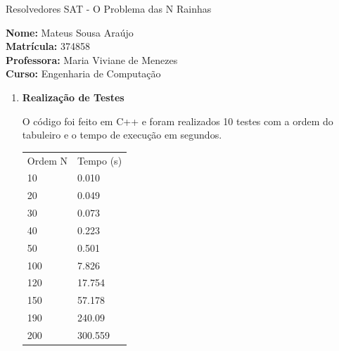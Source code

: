 \documentclass[11pt,a4paper]{article}
\begin{document}
	\begin{center}
		\Large Resolvedores SAT - O Problema das N Rainhas  
	\end{center}

\begin{flushleft}
\textbf{Nome:} Mateus Sousa Araújo \\
\textbf{Matrícula:} 374858 \\
\textbf{Professora:} Maria Viviane de Menezes \\
\textbf{Curso:} Engenharia de Computação \\
\end{flushleft}

\begin{enumerate}

\item \textbf{Realização de Testes}

O código foi feito em C++ e foram realizados 10 testes com a ordem do tabuleiro e o tempo de execução em segundos.

\begin{table}[h]
 \centering
 {\renewcommand\arraystretch{1.25}
 
 \begin{tabular}{ l l }
  \cline{1-1}\cline{2-2}  
    \multicolumn{1}{|p{3.850cm}|}{Ordem N \centering } &
    \multicolumn{1}{p{4.217cm}|}{Tempo (s) \centering }
  \\  
  \cline{1-1}\cline{2-2}  
    \multicolumn{1}{|p{3.850cm}|}{10 \centering } &
    \multicolumn{1}{p{4.217cm}|}{0.010 \centering }
  \\  
  \cline{1-1}\cline{2-2}  
    \multicolumn{1}{|p{3.850cm}|}{20 \centering } &
    \multicolumn{1}{p{4.217cm}|}{0.049 \centering}
  \\  
  \cline{1-1}\cline{2-2}  
    \multicolumn{1}{|p{3.850cm}|}{30 \centering } &
    \multicolumn{1}{p{4.217cm}|}{0.073 \centering}
  \\  
  \cline{1-1}\cline{2-2}  
    \multicolumn{1}{|p{3.850cm}|}{40 \centering } &
    \multicolumn{1}{p{4.217cm}|}{0.223 \centering}
  \\  
  \cline{1-1}\cline{2-2}  
    \multicolumn{1}{|p{3.850cm}|}{50 \centering } &
    \multicolumn{1}{p{4.217cm}|}{0.501 \centering}
  \\  
  \cline{1-1}\cline{2-2}  
    \multicolumn{1}{|p{3.850cm}|}{100 \centering } &
    \multicolumn{1}{p{4.217cm}|}{7.826 \centering}
  \\  
  \cline{1-1}\cline{2-2}  
    \multicolumn{1}{|p{3.850cm}|}{120 \centering } &
    \multicolumn{1}{p{4.217cm}|}{17.754 \centering}
  \\  
  \cline{1-1}\cline{2-2}  
    \multicolumn{1}{|p{3.850cm}|}{150 \centering } &
    \multicolumn{1}{p{4.217cm}|}{57.178 \centering}
  \\  
  \cline{1-1}\cline{2-2}  
    \multicolumn{1}{|p{3.850cm}|}{190 \centering } &
    \multicolumn{1}{p{4.217cm}|}{240.09 \centering}
  \\  
  \cline{1-1}\cline{2-2}  
    \multicolumn{1}{|p{3.850cm}|}{200 \centering } &
    \multicolumn{1}{p{4.217cm}|}{300.559 \centering}
  \\  
  \hline


\end{tabular}}
\end{table}
\end{enumerate}
\end{document}
